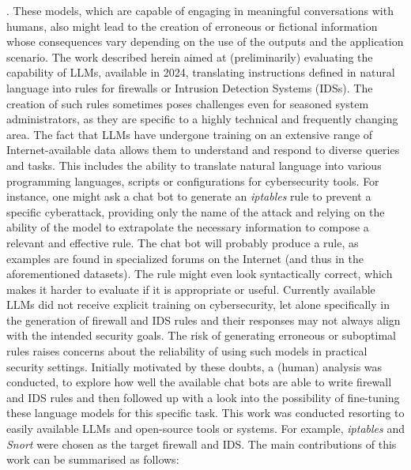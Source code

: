 \documentclass[sigconf]{acmart}
\begin{document}
. These models, which are capable of engaging in meaningful conversations
with humans, also might lead to the creation of erroneous or fictional information \cite{Chen23, Kabir23} whose consequences vary depending on
the use of the outputs and the application scenario. The work described herein aimed at (preliminarily) evaluating the capability of
LLMs, available in 2024, translating instructions defined in natural
language into rules for firewalls or Intrusion Detection Systems
(IDSs). The creation of such rules sometimes poses challenges even
for seasoned system administrators, as they are specific to a highly
technical and frequently changing area.
The fact that LLMs have undergone training on an extensive
range of Internet-available data allows them to understand and
respond to diverse queries and tasks. This includes the ability to
translate natural language into various programming languages,
scripts or configurations for cybersecurity tools. For instance, one
might ask a chat bot to generate an {\itshape iptables} rule to prevent a specific
cyberattack, providing only the name of the attack and relying on
the ability of the model to extrapolate the necessary information to
compose a relevant and effective rule. The chat bot will probably
produce a rule, as examples are found in specialized forums on
the Internet (and thus in the aforementioned datasets). The rule might even look syntactically correct, which makes it harder to
evaluate if it is appropriate or useful. Currently available LLMs did
not receive explicit training on cybersecurity, let alone specifically
in the generation of firewall and IDS rules and their responses
may not always align with the intended security goals. The risk
of generating erroneous or suboptimal rules raises concerns about
the reliability of using such models in practical security settings.
Initially motivated by these doubts, a (human) analysis was conducted, to explore how well the available chat bots are able to write
firewall and IDS rules and then followed up with a look into the
possibility of fine-tuning these language models for this specific
task. This work was conducted resorting to easily available LLMs
and open-source tools or systems. For example, {\itshape iptables} \cite{Russsell98} and {\itshape Snort} \cite{Shaqiri21} were chosen as the target firewall and IDS.
The main contributions of this work can be summarised as follows:
\end{document}
